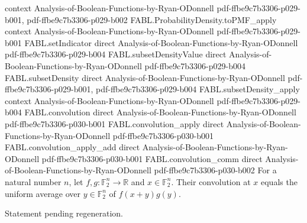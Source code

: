 \begin{theorem}
  {context}
  {Analysis-of-Boolean-Functions-by-Ryan-ODonnell}
  {pdf-ffbe9c7b3306-p029-b001,
    pdf-ffbe9c7b3306-p029-b002}
\proofstep
  {FABL.ProbabilityDensity.toPMF_apply}
  {context}
  {Analysis-of-Boolean-Functions-by-Ryan-ODonnell}
  {pdf-ffbe9c7b3306-p029-b001}
\proofstep
  {FABL.setIndicator}
  {direct}
  {Analysis-of-Boolean-Functions-by-Ryan-ODonnell}
  {pdf-ffbe9c7b3306-p029-b004}
\proofstep
  {FABL.subsetDensityValue}
  {direct}
  {Analysis-of-Boolean-Functions-by-Ryan-ODonnell}
  {pdf-ffbe9c7b3306-p029-b004}
\proofstep
  {FABL.subsetDensity}
  {direct}
  {Analysis-of-Boolean-Functions-by-Ryan-ODonnell}
  {pdf-ffbe9c7b3306-p029-b001,
    pdf-ffbe9c7b3306-p029-b004}
\proofstep
  {FABL.subsetDensity_apply}
  {context}
  {Analysis-of-Boolean-Functions-by-Ryan-ODonnell}
  {pdf-ffbe9c7b3306-p029-b004}
\proofstep
  {FABL.convolution}
  {direct}
  {Analysis-of-Boolean-Functions-by-Ryan-ODonnell}
  {pdf-ffbe9c7b3306-p030-b001}
\proofstep
  {FABL.convolution_apply}
  {direct}
  {Analysis-of-Boolean-Functions-by-Ryan-ODonnell}
  {pdf-ffbe9c7b3306-p030-b001}
\proofstep
  {FABL.convolution_apply_add}
  {direct}
  {Analysis-of-Boolean-Functions-by-Ryan-ODonnell}
  {pdf-ffbe9c7b3306-p030-b001}
\proofstep
  {FABL.convolution_comm}
  {direct}
  {Analysis-of-Boolean-Functions-by-Ryan-ODonnell}
  {pdf-ffbe9c7b3306-p030-b002}
For a natural number $n$, let $f,g:\mathbb{F}_2^n\to\mathbb{R}$ and
$x\in\mathbb{F}_2^n$. Their convolution at $x$ equals the uniform average over
$y\in\mathbb{F}_2^n$ of $f(x+y)g(y)$.
\end{theorem}

\begin{theorem}
\label{FABL.convolution_assoc}
\leanok
{}
Statement pending regeneration.
\end{theorem}

